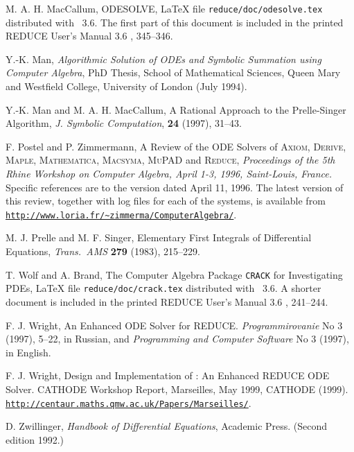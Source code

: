 \begin{thebibliography}{999}
 M. A. H. MacCallum, ODESOLVE, \LaTeX{} file
\texttt{reduce/doc/odesolve.tex} distributed with \REDUCE~3.6.  The
first part of this document is included in the printed REDUCE User's
Manual 3.6 \cite{Hearn-manual}, 345--346.

 Y.-K. Man, \textit{Algorithmic Solution of ODEs and
Symbolic Summation using Computer Algebra}, PhD Thesis, School of
Mathematical Sciences, Queen Mary and Westfield College, University of
London (July 1994).

 Y.-K. Man and M. A. H. MacCallum, A Rational
Approach to the Prelle-Singer Algorithm, \textit{J. Symbolic
Computation}, \textbf{24} (1997), 31--43.

 F. Postel and P. Zimmermann, A Review of the ODE
Solvers of \textsc{Axiom}, \textsc{Derive}, \textsc{Maple},
\textsc{Mathematica}, \textsc{Macsyma}, \textsc{MuPAD} and
\textsc{Reduce}, \textit{Proceedings of the 5th Rhine Workshop on
Computer Algebra, April 1-3, 1996, Saint-Louis, France.}
Specific references are to the version dated April 11, 1996.
The latest version of this review, together with log files for each of
the systems, is available from
\href{http://www.loria.fr/~zimmerma/ComputerAlgebra/}%
{\texttt{http://www.loria.fr/\textasciitilde zimmerma/ComputerAlgebra/}}.

 M. J. Prelle and M. F. Singer, Elementary
First Integrals of Differential Equations, \textit{Trans.\ AMS}
\textbf{279} (1983), 215--229.

 T. Wolf and A. Brand, The Computer Algebra Package
\texttt{CRACK} for Investigating PDEs, \LaTeX{} file
\texttt{reduce/doc/crack.tex} distributed with \REDUCE~3.6.  A shorter
document is included in the printed REDUCE User's Manual 3.6
\cite{Hearn-manual}, 241--244.

 F. J. Wright, An Enhanced ODE Solver for REDUCE.
\textit{Programmirovanie} No 3 (1997), 5--22, in Russian, and
\textit{Programming and Computer Software} No 3 (1997), in English.

 F. J. Wright, Design and Implementation of
 : An Enhanced REDUCE ODE Solver.  CATHODE Workshop
Report, Marseilles, May 1999, CATHODE (1999). \\
\href{http://centaur.maths.qmw.ac.uk/Papers/Marseilles/}%
{\texttt{http://centaur.maths.qmw.ac.uk/Papers/Marseilles/}}.

 D. Zwillinger, \textit{Handbook of Differential
Equations}, Academic Press.  (Second edition 1992.)


\end{thebibliography}

